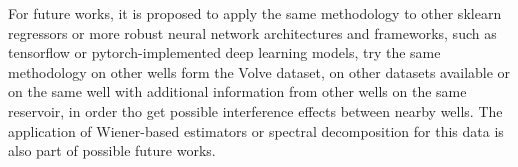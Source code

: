 \documentclass[conference]{IEEEtran}
\begin{document}
For future works, it is proposed to apply the same methodology to other sklearn regressors or more robust neural network architectures and frameworks, such as tensorflow or pytorch-implemented deep learning models, try the same methodology on other wells form the Volve dataset, on other datasets available or on the same well with additional information from other wells on the same reservoir, in order tho get possible interference effects between nearby wells. The application of Wiener-based estimators or spectral decomposition for this data is also part of possible future works.





% 

%




\end{document}
